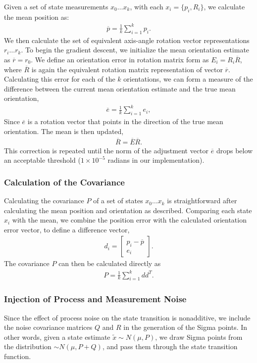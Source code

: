 Given a set of state measurements $x_0 \dots x_k$, with each $x_i = \{p_i,R_i\}$, we calculate the mean position as:
\begin{align}
\overline{p} = \frac{1}{k}\sum\limits_{i=1}^{k} p_i.
\end{align}
We then calculate the set of equivalent axis-angle rotation vector representations $r_i \dots r_k$. To begin the gradient descent, we initialize the mean orientation estimate as $\overline{r} = r_0$. We define an orientation error in rotation matrix form as $E_i = R_i\overline{R}$, where $\overline{R}$ is again the equivalent rotation matrix representation of vector $\overline{r}$. Calculating this error for each of the $k$ orientations, we can form a measure of the difference between the current mean orientation estimate and the true mean orientation,
\begin{align}
\overline{e} = \frac{1}{k}\sum\limits_{i=1}^{k} e_i,
\end{align}
Since $\overline{e}$ is a rotation vector that points in the direction of the true mean orientation. The mean is then updated,
\begin{align}
\overline{R} = \overline{E} \overline{R}.
\end{align}
This correction is repeated until the norm of the adjustment vector $\overline{e}$ drops below an acceptable threshold ($1\times10^{-5}$ radians in our implementation).

\subsubsection{Calculation of the Covariance}
Calculating the covariance $P$ of a set of states $x_0 \dots x_k$ is straightforward after calculating the mean position and orientation as described. Comparing each state $x_i$ with the mean, we combine the position error with the calculated orientation error vector, to define a difference vector,
\begin{align}
d_i = \begin{bmatrix} p_i - \overline{p}\\ 
e_i
\end{bmatrix}.
\end{align}
The covariance $P$ can then be calculated directly as
\begin{align}
P = \frac{1}{k}\sum\limits_{i=1}^{k}dd^T.
\end{align}

\subsubsection{Injection of Process and Measurement Noise}
Since the effect of process noise on the state transition is nonadditive, we include the noise covariance matrices $Q$ and $R$ in the generation of the Sigma points. In other words, given a state estimate $\tilde{x} \sim N\left(\mu,P\right)$, we draw Sigma points from the distribution $\sim N\left(\mu,P+Q\right)$, and pass them through the state transition function.
 
